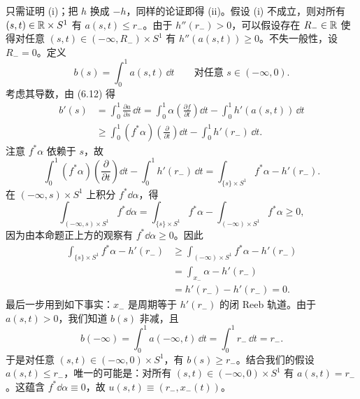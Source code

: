 \begin{wproof}
  只需证明 (i)；把 $h$ 换成 $-h$，同样的论证即得 (ii)。假设 (i) 不成立，则对所有
  $(s,t)\in\mathbb{R}\times S^1$ 有 $a(s,t)\le r_-$。由于 $h''(r_-)>0$，可以假设存在
  $R_-\in\mathbb{R}$ 使得对任意 $(s,t)\in(-\infty,R_-)\times S^1$ 有
  $h''(a(s,t))\ge0$。不失一般性，设 $R_-=0$。定义
  \[
    b(s)=\int_0^1 a(s,t)\,\dd t
    \qquad\text{对任意 } s\in(-\infty,0).
  \]
  考虑其导数，由 (6.12) 得
  \begin{align*}
    b'(s)&=\int_0^1\frac{\partial a}{\partial s}\,\dd t
    =\int_0^1\alpha\left(\frac{\partial f}{\partial t}\right)\dd t
    -\int_0^1h'(a(s,t))\,\dd t\\
    &\ge\int_0^1(f^*\alpha)\left(\frac{\partial}{\partial t}\right)\dd t
    -\int_0^1h'(r_-)\,\dd t.
  \end{align*}
  注意 $f^*\alpha$ 依赖于 $s$，故
  \[
    \int_0^1(f^*\alpha)\left(\frac{\partial}{\partial t}\right)\dd t
    -\int_0^1h'(r_-)\,\dd t
    =\int_{\{s\}\times S^1}f^*\alpha-h'(r_-).
  \]
  在 $(-\infty,s)\times S^1$ 上积分 $f^*\dd\alpha$，得
  \[
    \int_{(-\infty,s)\times S^1}f^*\dd\alpha
    =\int_{\{s\}\times S^1}f^*\alpha
    -\int_{(-\infty)\times S^1}f^*\alpha\ge0,
  \]
  因为由本命题正上方的观察有 $f^*\dd\alpha\ge0$。因此
  \begin{align*}
    \int_{\{s\}\times S^1}f^*\alpha-h'(r_-)
    &\ge\int_{(-\infty)\times S^1}f^*\alpha-h'(r_-)\\
    &=\int_{x_-}\alpha-h'(r_-)\\
    &=h'(r_-)-h'(r_-)=0.
  \end{align*}
  最后一步用到如下事实：$x_-$ 是周期等于 $h'(r_-)$ 的闭 Reeb 轨道。由于
  $a(s,t)>0$，我们知道 $b(s)$ 非减，且
  \[
    b(-\infty)=\int_0^1a(-\infty,t)\,\dd t=\int_0^1r_-\,\dd t=r_-.
  \]
  于是对任意 $(s,t)\in(-\infty,0)\times S^1$，有 $b(s)\ge r_-$。结合我们的假设
  $a(s,t)\le r_-$，唯一的可能是：对所有 $(s,t)\in(-\infty,0)\times S^1$ 有
  $a(s,t)=r_-$。这蕴含 $f^*\dd\alpha\equiv0$，故 $u(s,t)\equiv(r_-,x_-(t))$。
\end{wproof}


